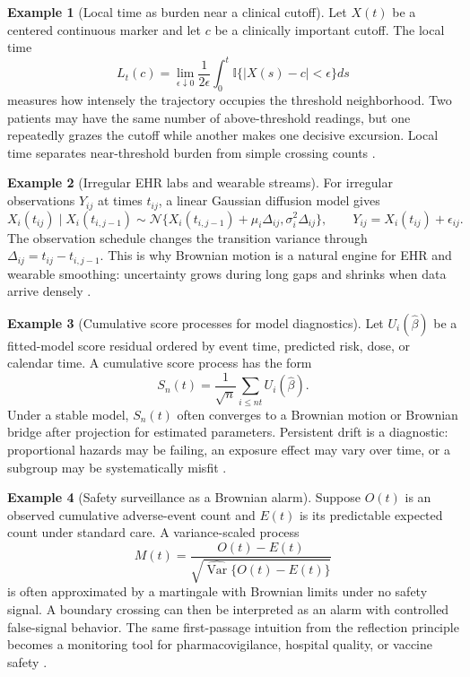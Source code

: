 \documentclass{article}
\theoremstyle{plain}
\theoremstyle{definition}
\newtheorem{example}{Example}
\begin{document}
\begin{example}[Local time as burden near a clinical cutoff]
Let \(X(t)\) be a centered continuous marker and let \(c\) be a clinically important cutoff. The local time
\[
L_t(c)=\lim_{\epsilon\downarrow0}
\frac{1}{2\epsilon}\int_0^t\mathbb{I}\{|X(s)-c|<\epsilon\}ds
\]
measures how intensely the trajectory occupies the threshold neighborhood. Two patients may have the same number of above-threshold readings, but one repeatedly grazes the cutoff while another makes one decisive excursion. Local time separates near-threshold burden from simple crossing counts \citep{karatzas2014brownian,morters2010brownian}.
\end{example}

\begin{example}[Irregular EHR labs and wearable streams]
For irregular observations \(Y_{ij}\) at times \(t_{ij}\), a linear Gaussian diffusion model gives
\[
X_i(t_{ij})\mid X_i(t_{i,j-1})
\sim
\mathcal{N}\{X_i(t_{i,j-1})+\mu_i\Delta_{ij},\sigma_i^2\Delta_{ij}\},
\qquad
Y_{ij}=X_i(t_{ij})+\epsilon_{ij}.
\]
The observation schedule changes the transition variance through \(\Delta_{ij}=t_{ij}-t_{i,j-1}\). This is why Brownian motion is a natural engine for EHR and wearable smoothing: uncertainty grows during long gaps and shrinks when data arrive densely \citep{kalman1960new,durbin2012time}.
\end{example}

\begin{example}[Cumulative score processes for model diagnostics]
Let \(U_i(\widehat\beta)\) be a fitted-model score residual ordered by event time, predicted risk, dose, or calendar time. A cumulative score process has the form
\[
S_n(t)=\frac{1}{\sqrt n}\sum_{i\le nt}U_i(\widehat\beta).
\]
Under a stable model, \(S_n(t)\) often converges to a Brownian motion or Brownian bridge after projection for estimated parameters. Persistent drift is a diagnostic: proportional hazards may be failing, an exposure effect may vary over time, or a subgroup may be systematically misfit \citep{andersen1993statistical,vandervaart1996weak,kosorok2008introduction}.
\end{example}

\begin{example}[Safety surveillance as a Brownian alarm]
Suppose \(O(t)\) is an observed cumulative adverse-event count and \(E(t)\) is its predictable expected count under standard care. A variance-scaled process
\[
M(t)=\frac{O(t)-E(t)}{\sqrt{\widehat{\operatorname{Var}}\{O(t)-E(t)\}}}
\]
is often approximated by a martingale with Brownian limits under no safety signal. A boundary crossing can then be interpreted as an alarm with controlled false-signal behavior. The same first-passage intuition from the reflection principle becomes a monitoring tool for pharmacovigilance, hospital quality, or vaccine safety \citep{fleming1991counting,jennison2000group}.
\end{example}
\end{document}
